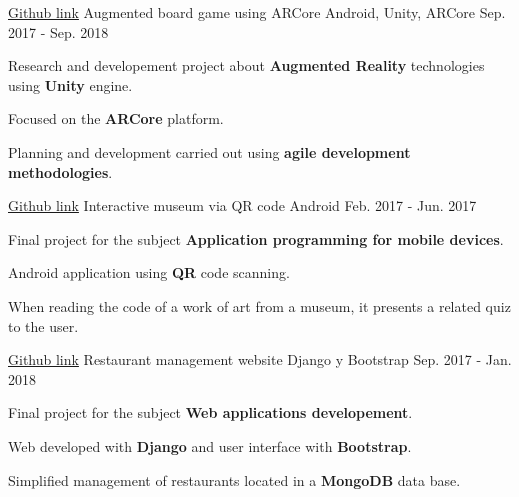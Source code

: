 

\begin{cventries}

  \cventry
    {\href{https://github.com/matl1995/TFG}{Github link}} %
    {Augmented board game using ARCore} %
    {Android, Unity, ARCore} %
    {Sep. 2017 - Sep. 2018} %
    {
      \begin{cvitems} %
        \item {Research and developement project about \textbf{Augmented Reality} technologies using \textbf{Unity} engine.}
        \item {Focused on the \textbf{ARCore} platform.}
        \item {Planning and development carried out using \textbf{agile development methodologies}.}
      \end{cvitems}
    }

  \cventry
    {\href{https://github.com/matl1995/PDM/tree/master/Museo}{Github link}} %
    {Interactive museum via QR code} %
    {Android} %
    {Feb. 2017 - Jun. 2017} %
    {
      \begin{cvitems} %
        \item {Final project for the subject \textbf{Application programming for mobile devices}.}
        \item {Android application using \textbf{QR} code scanning.}
        \item {When reading the code of a work of art from a museum, it presents a related quiz to the user.}
      \end{cvitems}
    }

  \cventry
    {\href{https://github.com/matl1995/DAI}{Github link}} %
    {Restaurant management website} %
    {Django y Bootstrap} %
    {Sep. 2017 - Jan. 2018} %
    {
      \begin{cvitems} %
        \item {Final project for the subject \textbf{Web applications developement}.}
        \item {Web developed with \textbf{Django} and user interface with \textbf{Bootstrap}.}
        \item {Simplified management of restaurants located in a \textbf{MongoDB} data base.}
      \end{cvitems}
    }


\end{cventries}

